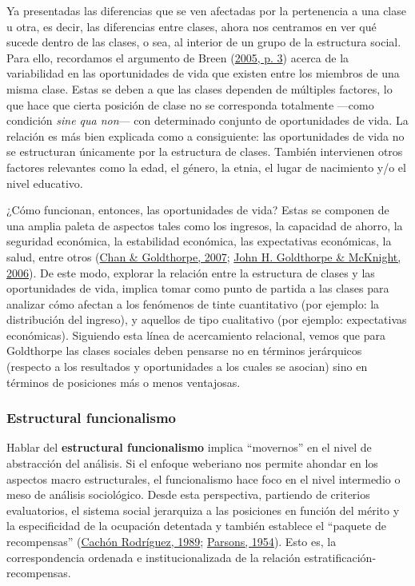 \documentclass[
]{article}
\begin{document}
Ya presentadas las diferencias que se ven afectadas por la pertenencia a una clase u otra, es decir, las diferencias entre clases, ahora nos centramos en ver qué sucede dentro de las clases, o sea, al interior de un grupo de la estructura social. Para ello, recordamos el argumento de Breen (\protect\hyperlink{ref-Breen2005}{2005, p. 3}) acerca de la variabilidad en las oportunidades de vida que existen entre los miembros de una misma clase. Estas se deben a que las clases dependen de múltiples factores, lo que hace que cierta posición de clase no se corresponda totalmente ---como condición \emph{sine qua non}--- con determinado conjunto de oportunidades de vida. La relación es más bien explicada como a consiguiente: las oportunidades de vida no se estructuran únicamente por la estructura de clases. También intervienen otros factores relevantes como la edad, el género, la etnia, el lugar de nacimiento y/o el nivel educativo.

¿Cómo funcionan, entonces, las oportunidades de vida? Estas se componen de una amplia paleta de aspectos tales como los ingresos, la capacidad de ahorro, la seguridad económica, la estabilidad económica, las expectativas económicas, la salud, entre otros (\protect\hyperlink{ref-Chan.Goldthorpe2007}{Chan \& Goldthorpe, 2007}; \protect\hyperlink{ref-Goldthorpe.McKnight2006}{John H. Goldthorpe \& McKnight, 2006}). De este modo, explorar la relación entre la estructura de clases y las oportunidades de vida, implica tomar como punto de partida a las clases para analizar cómo afectan a los fenómenos de tinte cuantitativo (por ejemplo: la distribución del ingreso), y aquellos de tipo cualitativo (por ejemplo: expectativas económicas). Siguiendo esta línea de acercamiento relacional, vemos que para Goldthorpe las clases sociales deben pensarse no en términos jerárquicos (respecto a los resultados y oportunidades a los cuales se asocian) sino en términos de posiciones más o menos ventajosas.

\hypertarget{estructural-funcionalismo}{%
\subsubsection{Estructural funcionalismo}\label{estructural-funcionalismo}}

Hablar del \textbf{estructural funcionalismo} implica ``movernos'' en el nivel de abstracción del análisis. Si el enfoque weberiano nos permite ahondar en los aspectos macro estructurales, el funcionalismo hace foco en el nivel intermedio o meso de análisis sociológico. Desde esta perspectiva, partiendo de criterios evaluatorios, el sistema social jerarquiza a las posiciones en función del mérito y la especificidad de la ocupación detentada y también establece el ``paquete de recompensas'' (\protect\hyperlink{ref-CachonRodriguez1989}{Cachón Rodríguez, 1989}; \protect\hyperlink{ref-Parsons1954}{Parsons, 1954}). Esto es, la correspondencia ordenada e institucionalizada de la relación estratificación-recompensas.
\end{document}
